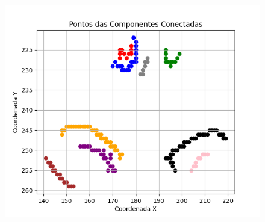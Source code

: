 \begin{figure}[h!]
    \vspace{1cm}

    \begin{minipage}[b]{0.45\textwidth}
        \centering
        \includegraphics[width=1\linewidth]{fig/04_connected_components_nose.png}
        \label{fig:grafos-nariz}
    \end{minipage}
    \label{fig:resultado-grafo}
\end{figure}